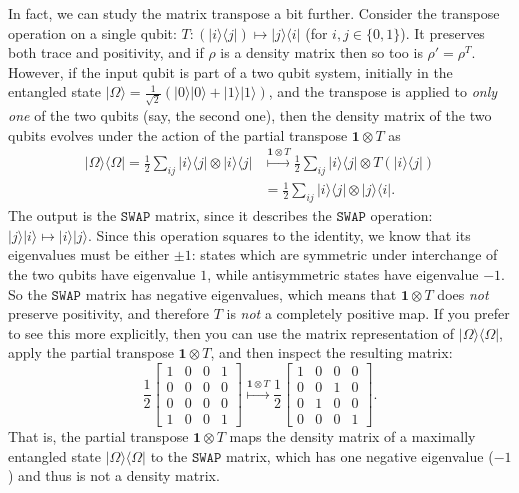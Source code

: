 \documentclass[fleqn]{article}
\begin{document}
In fact, we can study the matrix transpose a bit further.
Consider the transpose operation on a single qubit: \(T\colon(|i\rangle\langle j|)\mapsto|j\rangle\langle i|\) (for \(i,j\in\{0,1\}\)).
It preserves both trace and positivity, and if \(\rho\) is a density matrix then so too is \(\rho'=\rho^T\).
However, if the input qubit is part of a two qubit system, initially in the entangled state \(|\Omega\rangle=\frac{1}{\sqrt{2}}(|0\rangle|0\rangle+|1\rangle|1\rangle)\), and the transpose is applied to \emph{only one} of the two qubits (say, the second one), then the density matrix of the two qubits evolves under the action of the partial transpose \(\mathbf{1}\otimes T\) as
\[
  \begin{aligned}
    |\Omega\rangle\langle\Omega|
    = \frac{1}{2}\sum_{ij} |i\rangle\langle j| \otimes |i\rangle\langle j|
    &\overset{\mathbf{1}\otimes T}{\longmapsto}
    \frac{1}{2}\sum_{ij} |i\rangle\langle j| \otimes T( |i\rangle\langle j|)
  \\&= \frac{1}{2}\sum_{ij} |i\rangle\langle j| \otimes |j\rangle\langle i|.
  \end{aligned}
\]
The output is the \(\texttt{SWAP}\) matrix, since it describes the \(\texttt{SWAP}\) operation: \(|j\rangle|i\rangle\mapsto|i\rangle|j\rangle\).
Since this operation squares to the identity, we know that its eigenvalues must be either \(\pm1\): states which are symmetric under interchange of the two qubits have eigenvalue \(1\), while antisymmetric states have eigenvalue \(-1\).
So the \(\texttt{SWAP}\) matrix has negative eigenvalues, which means that \(\mathbf{1}\otimes T\) does \emph{not} preserve positivity, and therefore \(T\) is \emph{not} a completely positive map.
If you prefer to see this more explicitly, then you can use the matrix representation of \(|\Omega\rangle\langle\Omega|\), apply the partial transpose \(\mathbf{1}\otimes T\), and then inspect the resulting matrix:
\[
  \frac12\left[
  \begin{array}{cc|cc}
    1 & 0 & 0 & 1
  \\0 & 0 & 0 & 0
  \\\hline
    0 & 0 & 0 & 0
  \\1 & 0 & 0 & 1
  \end{array}\right]
  \overset{\mathbf{1}\otimes T}{\longmapsto}
  \frac12\left[
  \begin{array}{cc|cc}
    1 & 0 & 0 & 0
  \\0 & 0 & 1 & 0
  \\\hline
    0 & 1 & 0 & 0
  \\0 & 0 & 0 & 1
  \end{array}\right].
\]
That is, the partial transpose \(\mathbf{1}\otimes T\) maps the density matrix of a maximally entangled state \(|\Omega\rangle\langle\Omega|\) to the \(\texttt{SWAP}\) matrix, which has one negative eigenvalue (\(-1\)) and thus is not a density matrix.
\end{document}
